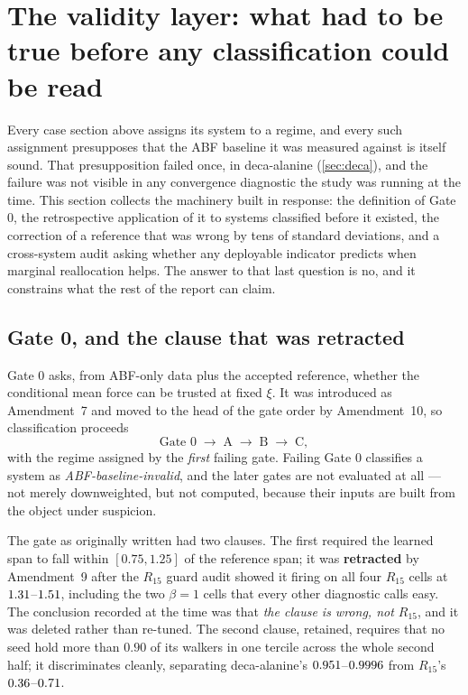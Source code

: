 \section{The validity layer: what had to be true before any classification could be read}
\label{sec:validity}

Every case section above assigns its system to a regime, and every such assignment presupposes
that the ABF baseline it was measured against is itself sound. That presupposition failed once,
in deca-alanine (\cref{sec:deca}), and the failure was not visible in any convergence diagnostic
the study was running at the time. This section collects the machinery built in response: the
definition of Gate 0, the retrospective application of it to systems classified before it
existed, the correction of a reference that was wrong by tens of standard deviations, and a
cross-system audit asking whether any deployable indicator predicts when marginal reallocation
helps. The answer to that last question is no, and it constrains what the rest of the report can
claim.

\subsection{Gate 0, and the clause that was retracted}
\label{sec:gate0}

Gate 0 asks, from ABF-only data plus the accepted reference, whether the conditional mean force
can be trusted at fixed $\xi$. It was introduced as Amendment~7 and moved to the head of the gate
order by Amendment~10, so classification proceeds
\[
  \text{Gate 0} \;\to\; \text{A} \;\to\; \text{B} \;\to\; \text{C},
\]
with the regime assigned by the \emph{first} failing gate. Failing Gate 0 classifies a system as
\emph{ABF-baseline-invalid}, and the later gates are not evaluated at all --- not merely
downweighted, but not computed, because their inputs are built from the object under suspicion.

The gate as originally written had two clauses. The first required the learned span to fall
within $[0.75, 1.25]$ of the reference span; it was \textbf{retracted} by Amendment~9 after the
$R_{15}$ guard audit showed it firing on all four $R_{15}$ cells at
$1.31$--$1.51$, including the two $\beta = 1$ cells that every other
diagnostic calls easy. The conclusion recorded at the time was that \emph{the clause is wrong,
not $R_{15}$}, and it was deleted rather than re-tuned. The second clause, retained, requires that
no seed hold more than $0.90$ of its walkers in one tercile across the whole second half; it
discriminates cleanly, separating deca-alanine's $0.951$--$0.9996$ from $R_{15}$'s
$0.36$--$0.71$.

